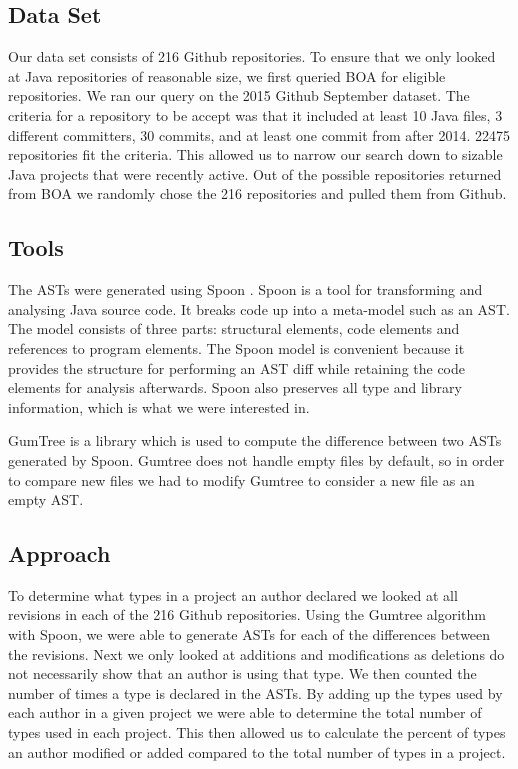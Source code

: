 \documentclass{sig-alternate-05-2015}
\begin{document}
\subsection{Data Set}
Our data set consists of 216 Github repositories. To ensure that we only looked at Java repositories of reasonable size, we first queried BOA \cite{Dyer-Nguyen-Rajan-Nguyen-13} for eligible repositories. We ran our query on the 2015 Github September dataset. The criteria for a repository to be accept was that it included at least 10 Java files, 3 different committers, 30 commits, and at least one commit from after 2014. 22475 repositories fit the criteria. This allowed us to narrow our search down to sizable Java projects that were recently active. Out of the possible repositories returned from BOA we randomly chose the 216 repositories and pulled them from Github.

\subsection{Tools}
The ASTs were generated using Spoon \cite{pawlak:hal-01169705}. Spoon is a tool for transforming and analysing Java source code. It breaks code up into a meta-model such as an AST. The model consists of three parts: structural elements, code elements and references to program elements. The Spoon model is convenient because it provides the structure for performing an AST diff while retaining the code elements for analysis afterwards. Spoon also preserves all type and library information, which is what we were interested in.

GumTree \cite{falleri:hal-01054552} is a library which is used to compute the difference between two ASTs generated by Spoon. Gumtree does not handle empty files by default, so in order to compare new files we had to modify Gumtree to consider a new file as an empty AST.

\subsection{Approach}
To determine what types in a project an author declared we looked at all revisions in each of the 216 Github repositories. Using the Gumtree algorithm with Spoon, we were able to generate ASTs for each of the differences between the revisions. Next we only looked at additions and modifications as deletions do not necessarily show that an author is using that type. We then counted the number of times a type is declared in the ASTs. By adding up the types used by each author in a given project we were able to determine the total number of types used in each project. This then allowed us to calculate the percent of types an author modified or added compared to the total number of types in a project.
\end{document}
